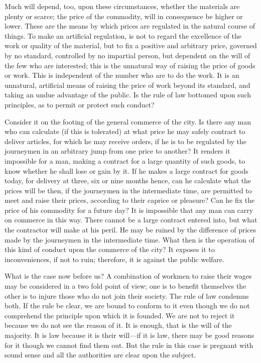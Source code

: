 \documentclass[
  letterpaper,
  11pt,
  DIV=9,
  openright]{scrbook}
\begin{document}
Much will depend, too, upon these circumstances, whether the materials
are plenty or scarce; the price of the commodity, will in consequence be
higher or lower. These are the means by which prices are regulated in
the natural course of things. To make an artificial regulation, is not
to regard the excellence of the work or quality of the material, but to
fix a positive and arbitrary price, governed by no standard, controlled
by no impartial person, but dependent on the will of the few who are
interested; this is the unnatural way of raising the price of goods or
work. This is independent of the number who are to do the work. It is an
unnatural, artificial means of raising the price of work beyond its
standard, and taking an undue advantage of the public. Is the rule of
law bottomed upon such principles, as to permit or protect such conduct?

Consider it on the footing of the general commerce of the city. Is there
any man who can calculate (if this is tolerated) at what price he may
safely contract to deliver articles, for which he may receive orders, if
he is to be regulated by the journeymen in an arbitrary jump from one
price to another? It renders it impossible for a man, making a contract
for a large quantity of such goods, to know whether he shall lose or
gain by it. If he makes a large contract for goods today, for delivery
at three, six or nine months hence, can he calculate what the prices
will be then, if the journeymen in the intermediate time, are permitted
to meet and raise their prices, according to their caprice or pleasure?
Can he fix the price of his commodity for a future day? It is impossible
that any man can carry on commerce in this way. There cannot be a large
contract entered into, but what the contractor will make at his peril.
He may be ruined by the difference of prices made by the journeymen in
the intermediate time. What then is the operation of this kind of
conduct upon the commerce of the city? It exposes it to inconveniences,
if not to ruin; therefore, it is against the public welfare.

What is the case now before us? A combination of workmen to raise their
wages may be considered in a two fold point of view; one is to benefit
themselves the other is to injure those who do not join their society.
The rule of law condemns both. If the rule be clear, we are bound to
conform to it even though we do not comprehend the principle upon which
it is founded. We are not to reject it because we do not see the reason
of it. It is enough, that is the will of the majority. It is law because
it is their will---if it is law, there may be good reasons for it though
we cannot find them out. But the rule in this case is pregnant with
sound sense and all the authorities are clear upon the subject.
\end{document}
